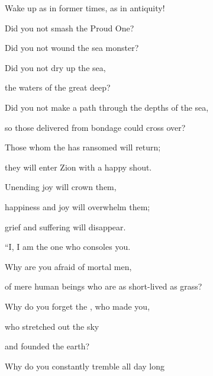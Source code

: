 {\par }{\Q Wake up
as in former
times,
as in antiquity!
\par }{\Q Did you
not
smash
the Proud One?

\par }{\Q Did you not wound
the sea monster?
\par }{\Q {}Did you
not
dry
up the sea,
\par }{\Q the waters
of the great
deep?
\par }{\Q Did you not make
a path
through the depths
of the sea,
\par }{\Q so
those delivered from bondage
could cross over?
\par }{\Q {}Those whom the
{}
has ransomed
will return;
\par }{\Q they will enter
Zion
with a happy
shout.
\par }{\Q Unending
joy will crown
them,

\par }{\Q happiness
and joy
will overwhelm
them;
\par }{\Q grief
and suffering
will disappear.
\par }{\Q {}“I,
I am
the one who
consoles
you.
\par }{\Q Why are you
afraid
of mortal
men,
\par }{\Q of mere human
beings who are as short-lived
as grass?
\par }{\Q {}Why do you forget
the {}, who made
you,
\par }{\Q who stretched
out the sky
\par }{\Q and founded
the earth?
\par }{\Q Why do you constantly
tremble
all
day
long

}
